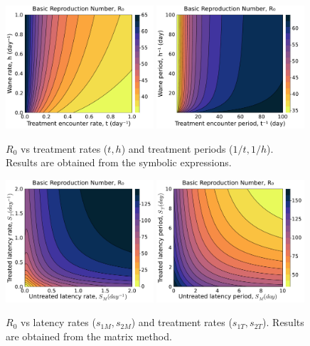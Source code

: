 \documentclass{article}
\begin{document}
\begin{figure}[H]
    \centering
    \includegraphics[width=0.49\textwidth]{../../fig/brn_txh_heatmap_s.pdf}
    \includegraphics[width=0.49\textwidth]{../../fig/brn_txh_heatmap_rev_s.pdf}
    \caption{\(R_0\) vs treatment rates (\(t,h\)) and treatment periods (\(1/t,1/h\)). Results are obtained from the symbolic expressions.}
\end{figure}

\begin{figure}[H]
    \centering
    \includegraphics[width=0.49\textwidth]{../../fig/R0_STxSM.pdf}
    \includegraphics[width=0.49\textwidth]{../../fig/R0_STxSM_rev.pdf}
    \caption{\(R_0\) vs latency rates (\(s_{1M},s_{2M}\)) and treatment rates (\(s_{1T},s_{2T}\)). Results are obtained from the matrix method.}
\end{figure}
\end{document}
